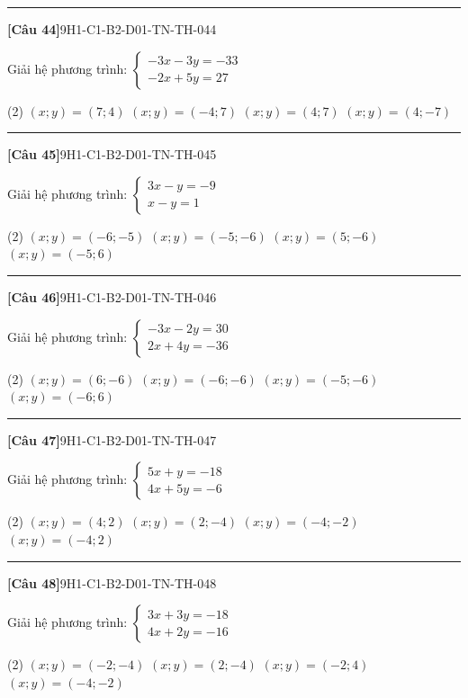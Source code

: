 \documentclass[12pt,a4paper]{article}
\newif\ifloigiai
\newenvironment{cauhoi}[2]{%
  \par\medskip\noindent\rule{\textwidth}{0.4pt}\par\nopagebreak
  \noindent\textbf{[#1]}\hfill{\scriptsize\ttfamily #2}\par\nopagebreak\smallskip}{\par}
\newcommand{\dapan}[1]{\ifloigiai\par\smallskip\noindent\textit{Đáp án:} \textbf{#1}\par\fi}
\begin{document}
\begin{cauhoi}{Câu 44}{9H1-C1-B2-D01-TN-TH-044}
Giải hệ phương trình: $\begin{cases}-3x - 3y=-33\\ -2x + 5y=27\end{cases}$
\begin{tasks}(2)
\task $(x;y)=(7;4)$
\task $(x;y)=(-4;7)$
\task $(x;y)=(4;7)$
\task $(x;y)=(4;-7)$
\end{tasks}
\dapan{C}
\end{cauhoi}
\begin{cauhoi}{Câu 45}{9H1-C1-B2-D01-TN-TH-045}
Giải hệ phương trình: $\begin{cases}3x - y=-9\\ x - y=1\end{cases}$
\begin{tasks}(2)
\task $(x;y)=(-6;-5)$
\task $(x;y)=(-5;-6)$
\task $(x;y)=(5;-6)$
\task $(x;y)=(-5;6)$
\end{tasks}
\dapan{B}
\end{cauhoi}
\begin{cauhoi}{Câu 46}{9H1-C1-B2-D01-TN-TH-046}
Giải hệ phương trình: $\begin{cases}-3x - 2y=30\\ 2x + 4y=-36\end{cases}$
\begin{tasks}(2)
\task $(x;y)=(6;-6)$
\task $(x;y)=(-6;-6)$
\task $(x;y)=(-5;-6)$
\task $(x;y)=(-6;6)$
\end{tasks}
\dapan{B}
\end{cauhoi}
\begin{cauhoi}{Câu 47}{9H1-C1-B2-D01-TN-TH-047}
Giải hệ phương trình: $\begin{cases}5x + y=-18\\ 4x + 5y=-6\end{cases}$
\begin{tasks}(2)
\task $(x;y)=(4;2)$
\task $(x;y)=(2;-4)$
\task $(x;y)=(-4;-2)$
\task $(x;y)=(-4;2)$
\end{tasks}
\dapan{D}
\end{cauhoi}
\begin{cauhoi}{Câu 48}{9H1-C1-B2-D01-TN-TH-048}
Giải hệ phương trình: $\begin{cases}3x + 3y=-18\\ 4x + 2y=-16\end{cases}$
\begin{tasks}(2)
\task $(x;y)=(-2;-4)$
\task $(x;y)=(2;-4)$
\task $(x;y)=(-2;4)$
\task $(x;y)=(-4;-2)$
\end{tasks}
\dapan{A}
\end{cauhoi}
\end{document}
